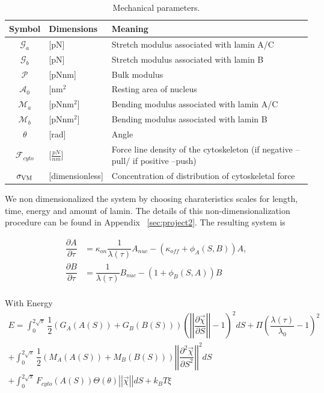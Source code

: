 \begin{table}[t!]
\caption{Mechanical parameters.}\centering \label{tab:nucmodelparameters} 
\begin{tabular}{ c  l  l}
\hline
Symbol & Dimensions & Meaning \\
\hline
$\mathcal{G}_a $ & [pN]  & Stretch modulus associated with lamin A/C \\
$\mathcal{G}_b$& [pN] & Stretch modulus associated with lamin B\\
$\mathcal{P}$ & [pNnm] & Bulk modulus \\
$\mathcal{A}_0$  & [nm$^2$ & Resting area of nucleus\\
$\mathcal{M}_a$ & [pNnm$^2$] &  Bending modulus associated with lamin A/C\\
$\mathcal{M}_b $ & [pNnm$^2$] &  Bending modulus associated with lamin B\\
$\theta$ &  [rad] & Angle \\
$\mathcal{F}_{cyto}$ & [$\frac{pN}{nm}$] & Force line density of the cytoskeleton (if negative --pull/ if positive --push)\\
$\sigma_{\rm VM}$ & [dimensionless] & Concentration of distribution of cytoskeletal force\\
\hline
\end{tabular}
\end{table}


We non dimensionalized the system by choosing charateristics scales for length, time, energy and amount of lamin. The details of this non-dimensionalization procedure can be found in Appendix ~\ref{sec:project2}. The resulting system is


\begin{align}
\dfrac{\partial A}{\partial \tau} &= \kappa_{on}\dfrac{1}{\lambda (\tau)} A_{nuc}  - (\kappa_{off}+ \phi_A (S,B)) A,  \\[10pt]
\dfrac{\partial B}{\partial \tau} &= \dfrac{1}{\lambda (\tau)} B_{nuc}  - (1+ \phi_B (S,A)) B  \\[10pt]
\end{align}

With Energy 
\begin{align}
 E = \displaystyle \int_0^{2 \sqrt{\pi}} \dfrac{1}{2} (G_A(A(S))+ G_B(B(S)))\left( \left |\left|  \dfrac{\partial \vec{\chi} }{\partial S} \right|\right| - 1\right)^2  dS + \Pi \left(\dfrac{\lambda(\tau)}{\lambda_0} -1\right)^2\\[10pt]
 +\displaystyle\int_0^{2\sqrt{\pi}} \dfrac{1}{2 } (M_A(A(S))+ M_B(B(S)))\left|\left| \dfrac{\partial^2 \vec{\chi}}{\partial S^2} \right|\right|^2 dS\\[10pt]
+ \displaystyle\int_0^{2\sqrt{\pi}} F_{cyto}(A(S))\Theta (\theta) \left|\left| \vec{\chi} \right|\right| dS +k_BT \xi
\end{align}

